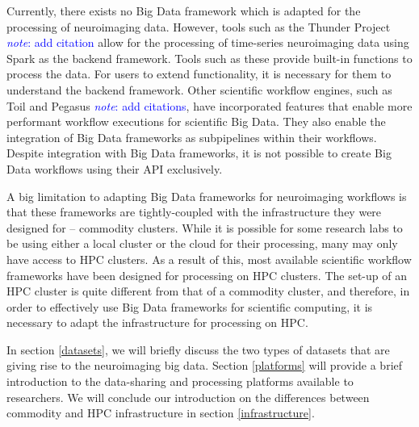\documentclass{report}
\newcommand{\note}[1]{\textcolor{blue}{\textit{note}: #1}}
\begin{document}
        Currently, there exists no Big Data framework which is adapted for the
        processing of neuroimaging data. However, tools such as the Thunder 
        Project \note{add citation} allow for the processing of time-series
        neuroimaging data using Spark as the backend framework. Tools such as 
        these provide built-in functions to process the data. For users to 
        extend functionality, it is necessary for them to understand the backend
        framework. Other scientific workflow engines, such as Toil and Pegasus
        \note{add citations}, have incorporated features that enable more 
        performant workflow executions for scientific Big Data. They also enable
        the integration of Big Data frameworks as subpipelines within their 
        workflows. Despite integration with Big Data frameworks, it is not
        possible to create Big Data workflows using their API exclusively.

        A big limitation to adapting Big Data frameworks for neuroimaging 
        workflows is that these frameworks are tightly-coupled with the 
        infrastructure they were designed for -- commodity clusters. While
        it is possible for some research labs to be using either a local cluster
        or the cloud for their processing, many may only have access to HPC
        clusters. As a result of this, most available scientific workflow 
        frameworks have been designed for processing on HPC clusters. The 
        set-up of an HPC cluster is quite different from that of a commodity 
        cluster, and therefore, in order to effectively use Big Data frameworks
        for scientific computing, it is necessary to adapt the infrastructure 
        for processing on HPC.

        In section \ref{datasets}, we will briefly discuss the two types of 
        datasets that are giving rise to the neuroimaging big data. Section 
        \ref{platforms} will provide a brief introduction to the data-sharing
        and processing platforms available to researchers. We will conclude our 
        introduction on the differences between commodity and HPC infrastructure
        in section \ref{infrastructure}.
\end{document}

